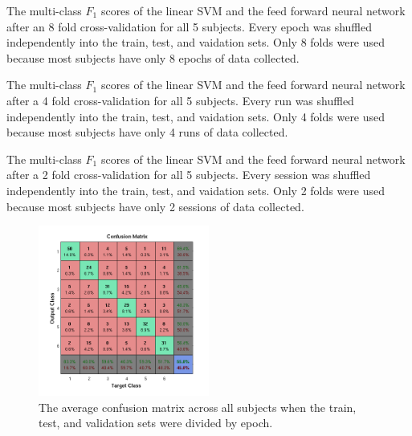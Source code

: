 \documentclass[twocolumn,final]{article}
\begin{document}
\begin{table}[!htbp]
\centering

\caption{
The multi-class $F_1$ scores of the linear SVM and the feed forward neural network after an 8 fold cross-validation for all 5 subjects. 
Every epoch was shuffled independently into the train, test, and vaidation sets. 
Only 8 folds were used because most subjects have only 8 epochs of data collected.}
\label{tab:epoch-shuffle}
\end{table}

\begin{table}[!htbp]
\centering

\caption{
The multi-class $F_1$ scores of the linear SVM and the feed forward neural network after a 4 fold cross-validation for all 5 subjects. 
Every run was shuffled independently into the train, test, and vaidation sets. 
Only 4 folds were used because most subjects have only 4 runs of data collected.}
\label{tab:run-shuffle}
\end{table}

\begin{table}[!htbp]
\centering

\caption{The multi-class $F_1$ scores of the linear SVM and the feed forward neural network after a 2 fold cross-validation for all 5 subjects. 
Every session was shuffled independently into the train, test, and vaidation sets. 
Only 2 folds were used because most subjects have only 2 sessions of data collected.}
\label{tab:session-shuffle}
\end{table}

\begin{figure}[!htbp]
\centering
\includegraphics[width=0.5\textwidth]{figures/confusion-average}
\caption{The average confusion matrix across all subjects when the train, test, and validation sets were divided by epoch.}
\label{fig:confusion-average}
\end{figure}
\end{document}

